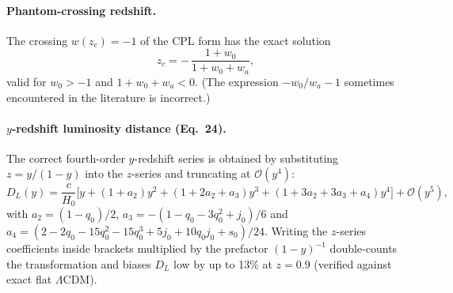 \paragraph{Phantom-crossing redshift.} The crossing $w(z_c) = -1$ of the CPL
form has the exact solution
\begin{equation}
z_c = -\,\frac{1+w_0}{1+w_0+w_a},
\end{equation}
valid for $w_0 > -1$ and $1+w_0+w_a < 0$. (The expression $-w_0/w_a - 1$
sometimes encountered in the literature is incorrect.)

\paragraph{$y$-redshift luminosity distance (Eq.~24).} The correct
fourth-order $y$-redshift series is obtained by substituting
$z = y/(1-y)$ into the $z$-series and truncating at $\mathcal{O}(y^4)$:
\begin{equation}
D_L(y) = \frac{c}{H_0}\Big[y + (1{+}a_2)y^2 + (1{+}2a_2{+}a_3)y^3
+ (1{+}3a_2{+}3a_3{+}a_4)y^4\Big] + \mathcal{O}(y^5),
\end{equation}
with $a_2 = (1-q_0)/2$, $a_3 = -(1-q_0-3q_0^2+j_0)/6$ and
$a_4 = (2-2q_0-15q_0^2-15q_0^3+5j_0+10q_0j_0+s_0)/24$. Writing the
$z$-series coefficients inside brackets multiplied by the prefactor
$(1-y)^{-1}$ double-counts the transformation and biases $D_L$ low by up to
13\% at $z=0.9$ (verified against exact flat $\Lambda$CDM).
